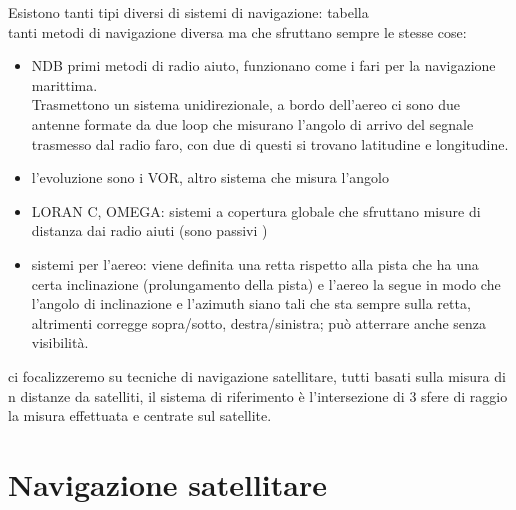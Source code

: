 \documentclass[oneside, 12pt]{extbook}
\begin{document}
Esistono tanti tipi diversi di sistemi di navigazione: tabella\\
tanti metodi di navigazione diversa ma che sfruttano sempre le stesse cose:
\begin{itemize}
	\item NDB primi metodi di radio aiuto, funzionano come i fari per la navigazione marittima.
	\\Trasmettono un sistema unidirezionale, a bordo dell'aereo ci sono due antenne formate da due loop che misurano l'angolo di arrivo del segnale trasmesso dal radio faro, con due di questi si trovano latitudine e longitudine.\\
	\item l'evoluzione sono i VOR, altro sistema che misura l'angolo
	\item LORAN C, OMEGA: sistemi a copertura globale che sfruttano misure di distanza dai radio aiuti (sono passivi
)
	\item sistemi per l'aereo: viene definita una retta rispetto alla pista che ha una certa inclinazione (prolungamento della pista) e l'aereo la segue in modo che l'angolo di inclinazione e l'azimuth siano tali che sta sempre sulla retta, altrimenti corregge sopra/sotto, destra/sinistra; può atterrare anche senza visibilità.
\end{itemize}
ci focalizzeremo su tecniche di navigazione satellitare, tutti basati sulla misura di n distanze da satelliti, il sistema di riferimento è l'intersezione di 3 sfere di raggio la misura effettuata e centrate sul satellite.


\chapter{Navigazione satellitare}
\end{document}
